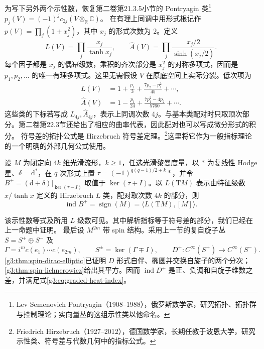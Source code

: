 为写下另外两个示性数，恢复第二卷第21.3.5小节的 Pontryagin 类\footnote{Lev Semenovich Pontryagin（1908--1988），俄罗斯数学家，研究拓扑、拓扑群与控制理论；实向量丛的这组示性类以他命名。}
\(p_j(V)=(-1)^j c_{2j}(V\otimes_{\mathbb R}\mathbb C)\)。
在有理上同调中用形式根记作 \(p(V)=\prod_j(1+x_j^2)\)，其中 \(x_j\) 的形式次数为 \(2\)。定义
\begin{equation}\label{g3:eq:l-ahat-series}
	L(V)=\prod_j\frac{x_j}{\tanh x_j},
	\qquad
	\widehat A(V)=\prod_j\frac{x_j/2}{\sinh(x_j/2)}.
\end{equation}
每个因子都是 \(x_j\) 的偶幂级数，乘积的齐次部分是 \(x_j^2\) 的对称多项式，因而是 \(p_1,p_2,\ldots\) 的唯一有理多项式。这里无需假设 \(V\) 在原底空间上实际分裂。低次项为
\begin{align}
	L(V)&=1+\frac{p_1}{3}
	+\frac{7p_2-p_1^2}{45}+\cdots,\label{g3:eq:l-low-degrees}\\
	\widehat A(V)&=1-\frac{p_1}{24}
	+\frac{7p_1^2-4p_2}{5760}+\cdots.\label{g3:eq:ahat-low-degrees}
\end{align}
这些类的下标若写成 \(L_{4j},\widehat A_{4j}\)，表示上同调次数 \(4j\)。与基本类配对时只取顶次部分。第二卷第22.3节还给出了相应的曲率代表，因此配对也可以写成微分形式的积分。
\ProseParagraphBreak
符号差的拓扑公式是 Hirzebruch 符号差定理。\footnote{Friedrich Hirzebruch（1927--2012），德国数学家，长期任教于波恩大学，研究示性类、符号差与代数几何中的指标公式。}这里将它作为一般指标理论的一个明确的外部几何公式使用。
\begin{theorem}\label{g3:thm:signature-l-index}
	设 \(M\) 为闭定向 \(4k\) 维光滑流形，\(k\ge1\)，任选光滑黎曼度量，以 \(*\) 为复线性 Hodge 星、\(\delta=\mathrm d^*\)，在 \(q\) 次形式上置 \(\tau=(-1)^{q(q-1)/2+k}*\)，并令 \(B^+=(\mathrm d+\delta)|_{\ker(\tau-I)}\) 取值于 \(\ker(\tau+I)\)。以 \(L(\mathrm TM)\) 表示由特征级数 \(x/\tanh x\) 定义的 Hirzebruch \(L\) 类，配对取次数 \(4k\) 的部分，则
	\begin{equation}\label{g3:eq:signature-l-index}
		\operatorname{ind}B^+
		=\operatorname{sign}(M)
		=\langle L(\mathrm TM),[M]\rangle.
	\end{equation}
\end{theorem}
该示性数等式及所用 \(L\) 级数可见\cite[第6节，式(6.5)及定理(6.6)，第577页]{AtiyahSinger1968III}。其中解析指标等于符号差的部分，我们已经在上一命题中证明。
\ProseParagraphBreak
最后设 \(M^{2m}\) 带 spin 结构。采用上一节的复自旋子丛 \(S=S^+\oplus S^-\) 及
\[
	\Gamma=i^m c(e_1)\cdots c(e_{2m}),
	\qquad S^\pm=\ker(\Gamma\mp I),
	\qquad D^+:C^\infty(S^+)\to C^\infty(S^-).
\]
\cref{g3:thm:spin-dirac-elliptic}已证明 \(D\) 形式自伴、椭圆并交换自旋子的两个分次；\cref{g3:thm:spin-lichnerowicz}给出其平方。因而 \(\operatorname{ind}D^+\) 是正、负调和自旋子维数之差，并满足式\eqref{g3:eq:graded-heat-index}。

